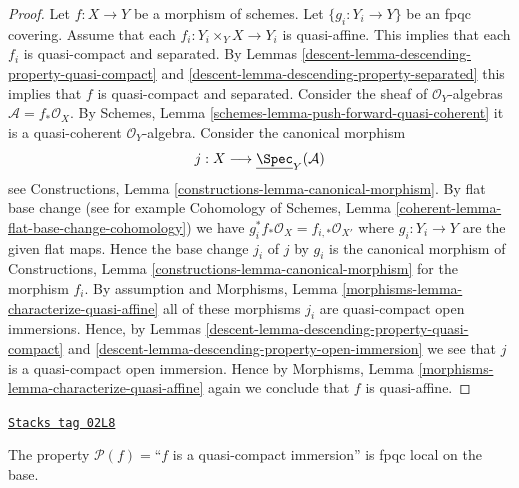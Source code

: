 \begin{proof}

Let $f : X \to Y$ be a morphism of schemes.
Let $\{g_i : Y_i \to Y\}$ be an fpqc covering.
Assume that each $f_i : Y_i \times_Y X \to Y_i$
is quasi-affine.
This implies that each $f_i$ is quasi-compact and separated.
By Lemmas \ref{descent-lemma-descending-property-quasi-compact}
and \ref{descent-lemma-descending-property-separated}
this implies that $f$ is quasi-compact and separated.
Consider the sheaf of $\mathcal{O}_Y$-algebras
$\mathcal{A} = f_*\mathcal{O}_X$.
By Schemes, Lemma \ref{schemes-lemma-push-forward-quasi-coherent}
it is a quasi-coherent $\mathcal{O}_Y$-algebra.
Consider the canonical morphism
$$
j : X \longrightarrow \underline{\Spec}_Y(\mathcal{A})
$$
see Constructions, Lemma \ref{constructions-lemma-canonical-morphism}.
By flat base change
(see for example
Cohomology of Schemes, Lemma \ref{coherent-lemma-flat-base-change-cohomology})
we have $g_i^*f_*\mathcal{O}_X = f_{i, *}\mathcal{O}_{X'}$
where $g_i : Y_i \to Y$ are the given flat
maps. Hence the base change $j_i$ of $j$ by $g_i$ is the canonical
morphism of Constructions, Lemma \ref{constructions-lemma-canonical-morphism}
for the morphism $f_i$. By assumption and
Morphisms, Lemma \ref{morphisms-lemma-characterize-quasi-affine}
all of these
morphisms $j_i$ are quasi-compact open immersions. Hence, by
Lemmas \ref{descent-lemma-descending-property-quasi-compact} and
\ref{descent-lemma-descending-property-open-immersion} we
see that $j$ is a quasi-compact open immersion.
Hence by
Morphisms, Lemma \ref{morphisms-lemma-characterize-quasi-affine}
again we conclude that $f$ is quasi-affine.
\end{proof}

\begin{lemma}
\label{descent-lemma-descending-property-quasi-compact-immersion}
\href{https://stacks.math.columbia.edu/tag/02L8}{\texttt{Stacks tag 02L8}}

The property $\mathcal{P}(f) =$``$f$ is a quasi-compact immersion''
is fpqc local on the base.
\end{lemma}

